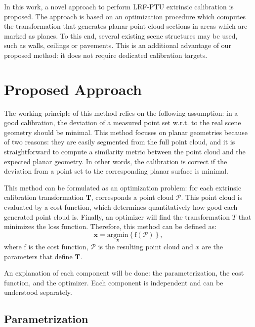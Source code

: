 \documentclass[conference]{IEEEtran}
\begin{document}
In this work, a novel approach to perform LRF-PTU extrinsic calibration is proposed. The approach is based on an optimization procedure which computes the transformation that generates planar point cloud sections in areas which are marked as planes. To this end, several existing scene structures may be used, such as walls, ceilings or pavements. This is an additional advantage of our proposed method: it does not require dedicated calibration targets.

\section{Proposed Approach}
\label{section:proposed_approach}

The working principle of this method relies on the following assumption: in a good calibration, the deviation of a measured point set w.r.t. to the real scene geometry should be minimal. This method focuses on planar geometries because of two reasons: they are easily segmented from the full point cloud, and it is straightforward to compute a similarity metric between the point cloud and the expected planar geometry. In other words, the calibration is correct if the deviation from a point set to the corresponding planar surface is minimal.

This method can be formulated as an optimization problem: for each extrinsic calibration transformation $\mathbf{T}$, corresponds a point cloud $\mathcal{P}$. This point cloud is evaluated by a cost function, which determines quantitatively how good each generated point cloud is. Finally, an optimizer will find the transformation $T$ that minimizes the loss function. Therefore, this method can be defined as:
%
\begin{equation}
    \mathbf{\mathbf{x}} = \underset{\mathbf{x}}{\mathrm{argmin}} \left\{ \mathrm{f}(\mathcal{P}) \right\},
\end{equation}
%
\noindent where $\mathrm{f}$ is the cost function, $\mathcal{P}$ is the resulting point cloud and $x$ are the parameters that define $\mathbf{T}$.

An explanation of each component will be done: the parameterization, the cost function, and the optimizer. Each component is independent and can be understood separately.

\subsection{Parametrization}
\end{document}
